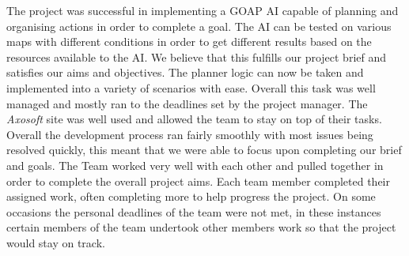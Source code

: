 \documentclass[a4paper]{report}
\begin{document}
The project was successful in implementing a GOAP AI capable of planning and organising actions in order to complete a goal. The AI can be tested on various maps with different conditions in order to get different results based on the resources available to the AI. We believe that this fulfills our project brief and satisfies our aims and objectives. The planner logic can now be taken and implemented into a variety of scenarios with ease. Overall this task was well managed and mostly ran to the deadlines set by the project manager. The \textit{Axosoft} site was well used and allowed the team to stay on top of their tasks. Overall the development process ran fairly smoothly with most issues being resolved quickly, this meant that we were able to focus upon completing our brief and goals. The Team worked very well with each other and pulled together in order to complete the overall project aims. Each team member completed their assigned work, often completing more to help progress the project. On some occasions the personal deadlines of the team were not met, in these instances certain members of the team undertook other members work so that the project would stay on track. 
\end{document}
